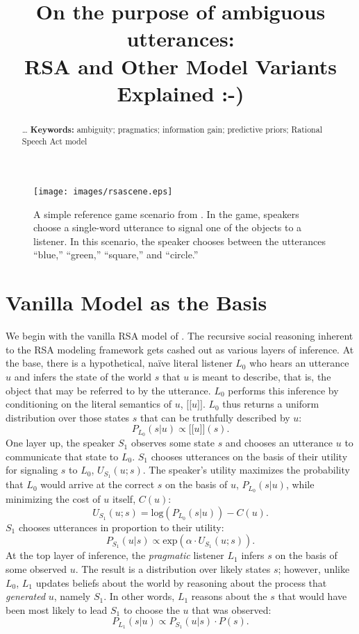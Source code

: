 \documentclass[10pt,a4paper]{article}
\title{On the purpose of ambiguous utterances: \\
	RSA and Other Model Variants Explained :-)}
\newcommand{\sem}[1]{\mbox{$[\![$#1$]\!]$}}
\begin{document}
\maketitle

\begin{abstract}
\dots
\textbf{Keywords:} 
ambiguity; pragmatics; information gain; predictive priors; Rational Speech Act model
\end{abstract}







\begin{figure}
	\centering
	\texttt{[image: images/rsascene.eps]}
	\caption{A simple reference game scenario from . In the game, speakers choose a single-word utterance to signal one of the objects to a listener. In this scenario, the speaker chooses between the utterances ``blue,'' ``green,'' ``square,'' and ``circle.''}\label{FG-ref-game}
\end{figure}



\section{Vanilla Model as the Basis}
We begin with the vanilla RSA model of . The recursive social reasoning inherent to the RSA modeling framework gets cashed out as various layers of inference. At the base, there is a hypothetical, na\"ive literal listener $L_0$ who hears an utterance $u$ and infers the state of the world $s$ that $u$ is meant to describe, that is, the object that may be referred to by the utterance. $L_0$ performs this inference by conditioning on the literal semantics of $u$, \sem{$u$}. $L_0$ thus returns a uniform distribution over those states $s$ that can be truthfully described by $u$:
$$P_{L_{0}}(s|u) \propto \sem{$u$}(s).$$
One layer up, the speaker $S_1$ observes some state $s$ and chooses an utterance $u$ to communicate that state to $L_0$. $S_1$ chooses utterances on the basis of their utility for signaling $s$ to $L_0$, $U_{S_1}(u;s)$. The speaker's utility maximizes the probability that $L_0$ would arrive at the correct $s$ on the basis of $u$, $P_{L_{0}}(s|u)$, while minimizing the cost of $u$ itself, $C(u)$:
$$U_{S_{1}}(u;s) = \textrm{log}(P_{L_{0}}(s|u)) - C(u).$$
$S_1$ chooses utterances in proportion to their utility:
$$P_{S_{1}} (u|s) \propto   \textrm{exp}(\alpha \cdot U_{S_{1}} (u;s)).$$
At the top layer of inference, the \emph{pragmatic} listener $L_1$ infers $s$ on the basis of some observed $u$. The result is a distribution over likely states $s$; however, unlike $L_0$, $L_1$ updates beliefs about the world by reasoning about the process that \emph{generated} $u$, namely $S_1$. In other words, $L_1$ reasons about the $s$ that would have been most likely to lead $S_1$ to choose the $u$ that was observed:
$$P_{L_{1}}(s|u) \propto P_{S_{1}}(u|s) \cdot P(s).$$
\end{document}
